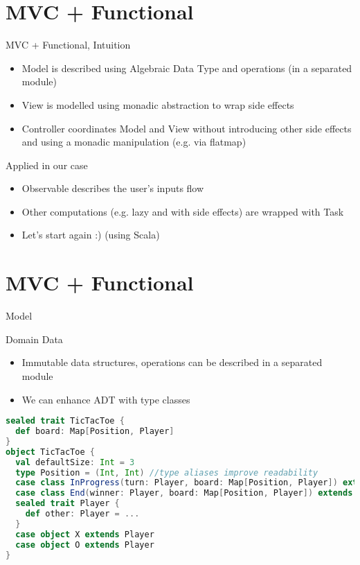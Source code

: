 \documentclass[presentation]{beamer}
\begin{document}
\section{MVC + Functional}
\begin{frame}[fragile]{MVC + Functional, Intuition}
\begin{itemize}
  \item Model is described using Algebraic Data Type and operations (in a separated module)
  \item View is modelled using monadic abstraction to wrap side effects
  \item Controller coordinates Model and View without introducing other side effects and using a monadic manipulation (e.g. via flatmap)
\end{itemize}


\begin{block}{Applied in our case}
\begin{itemize}
  \item Observable describes the user's inputs flow
  \item Other computations (e.g. lazy and with side effects) are wrapped with Task
  \item Let's start again :) (using Scala)
\end{itemize}
\end{block}

\end{frame}

\section{MVC + Functional}
\begin{frame}[fragile]{Model}

\begin{block}{Domain Data}
\begin{itemize}
  \item Immutable data structures, operations can be described in a separated module
  \item We can enhance ADT with type classes
\end{itemize}
\end{block}

\begin{lstlisting}[language=scala]
sealed trait TicTacToe {
  def board: Map[Position, Player]
}
object TicTacToe {
  val defaultSize: Int = 3
  type Position = (Int, Int) //type aliases improve readability
  case class InProgress(turn: Player, board: Map[Position, Player]) extends TicTacToe
  case class End(winner: Player, board: Map[Position, Player]) extends TicTacToe
  sealed trait Player {
    def other: Player = ...
  }
  case object X extends Player
  case object O extends Player
}
\end{lstlisting}

\end{frame}
\end{document}
